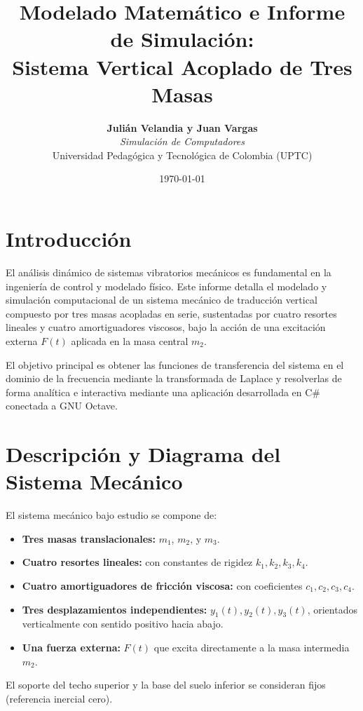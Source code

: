 \documentclass[12pt,letterpaper]{article}
\title{\textbf{Modelado Matemático e Informe de Simulación:\\Sistema Vertical Acoplado de Tres Masas}}
\author{\textbf{Julián Velandia y Juan Vargas}\\\textit{Simulación de Computadores}\\Universidad Pedagógica y Tecnológica de Colombia (UPTC)}
\date{\today}
\begin{document}
\maketitle
\tableofcontents
\newpage

\section{Introducción}
El análisis dinámico de sistemas vibratorios mecánicos es fundamental en la ingeniería de control y modelado físico. Este informe detalla el modelado y simulación computacional de un sistema mecánico de traducción vertical compuesto por tres masas acopladas en serie, sustentadas por cuatro resortes lineales y cuatro amortiguadores viscosos, bajo la acción de una excitación externa $F(t)$ aplicada en la masa central $m_2$.

El objetivo principal es obtener las funciones de transferencia del sistema en el dominio de la frecuencia mediante la transformada de Laplace y resolverlas de forma analítica e interactiva mediante una aplicación desarrollada en C\# conectada a GNU Octave.

\section{Descripción y Diagrama del Sistema Mecánico}
El sistema mecánico bajo estudio se compone de:
\begin{itemize}
    \item \textbf{Tres masas translacionales:} $m_1$, $m_2$, y $m_3$.
    \item \textbf{Cuatro resortes lineales:} con constantes de rigidez $k_1, k_2, k_3, k_4$.
    \item \textbf{Cuatro amortiguadores de fricción viscosa:} con coeficientes $c_1, c_2, c_3, c_4$.
    \item \textbf{Tres desplazamientos independientes:} $y_1(t), y_2(t), y_3(t)$, orientados verticalmente con sentido positivo hacia abajo.
    \item \textbf{Una fuerza externa:} $F(t)$ que excita directamente a la masa intermedia $m_2$.
\end{itemize}

El soporte del techo superior y la base del suelo inferior se consideran fijos (referencia inercial cero).
\end{document}
